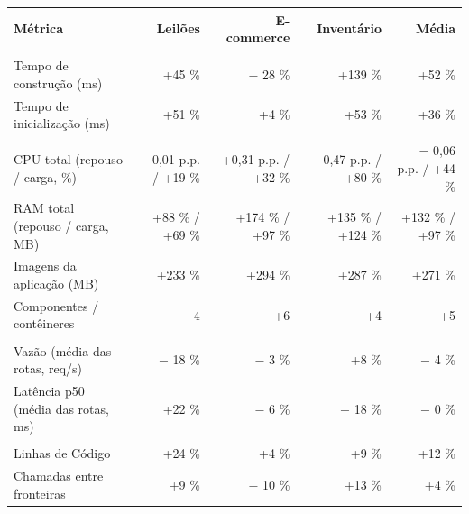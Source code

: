 \begin{quadro}[htb]
  \centering
  \caption{Variação acumulada por aplicação --- Transações.}
  \label{qua:comp_transacoes_variacoes}
  \renewcommand{\arraystretch}{1.15}
  \setlength{\tabcolsep}{3pt}
  \footnotesize
  \begin{tabularx}{\textwidth}{|>{\raggedright\arraybackslash}X|r|r|r|r|}
    \hline
    \textbf{Métrica} & \textbf{Leilões} & \textbf{E-commerce} & \textbf{Inventário} & \textbf{Média} \\
    \hline
    \multicolumn{5}{|l|}{\textbf{Agilidade}} \\
    \hline
    Tempo de construção (ms) & +45 \% & $-$ 28 \% & +139 \% & +52 \% \\
    Tempo de inicialização (ms) & +51 \% & +4 \% & +53 \% & +36 \% \\
    \hline
    \multicolumn{5}{|l|}{\textbf{Custo}} \\
    \hline
    CPU total (repouso / carga, \%) & $-$ 0,01 p.p. / +19 \% & +0,31 p.p. / +32 \% & $-$ 0,47 p.p. / +80 \% & $-$ 0,06 p.p. / +44 \% \\
    RAM total (repouso / carga, MB) & +88 \% / +69 \% & +174 \% / +97 \% & +135 \% / +124 \% & +132 \% / +97 \% \\
    Imagens da aplicação (MB) & +233 \% & +294 \% & +287 \% & +271 \% \\
    Componentes / contêineres & +4 & +6 & +4 & +5 \\
    \hline
    \multicolumn{5}{|l|}{\textbf{Desempenho}} \\
    \hline
    Vazão (média das rotas, req/s) & $-$ 18 \% & $-$ 3 \% & +8 \% & $-$ 4 \% \\
    Latência p50 (média das rotas, ms) & +22 \% & $-$ 6 \% & $-$ 18 \% & $-$ 0 \% \\
    \hline
    \multicolumn{5}{|l|}{\textbf{Manutenibilidade}} \\
    \hline
    Linhas de Código & +24 \% & +4 \% & +9 \% & +12 \% \\
    Chamadas entre fronteiras & +9 \% & $-$ 10 \% & +13 \% & +4 \% \\
    \hline
  \end{tabularx}
\end{quadro}
